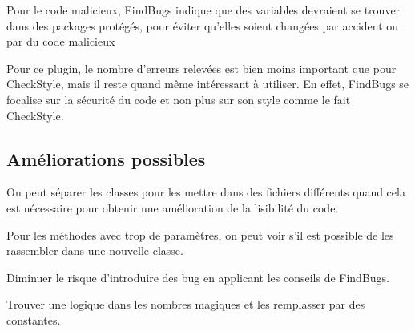 			Pour le code malicieux, FindBugs indique que des variables devraient se trouver dans des packages protégés, pour éviter qu'elles soient changées par accident ou par du code malicieux

			Pour ce plugin, le nombre d'erreurs relevées est bien moins important que pour CheckStyle, mais il reste quand même intéressant à utiliser. En effet, FindBugs se focalise sur la sécurité du code et non plus sur son style comme le fait CheckStyle.

	\subsection{Améliorations possibles}
		On peut séparer les classes pour les mettre dans des fichiers différents quand cela est nécessaire pour obtenir une amélioration de la lisibilité du code.

		Pour les méthodes avec trop de paramètres, on peut voir s'il est possible de les rassembler dans une nouvelle classe.

		Diminuer le risque d'introduire des bug en applicant les conseils de FindBugs.

		Trouver une logique dans les nombres magiques et les remplasser par des constantes.